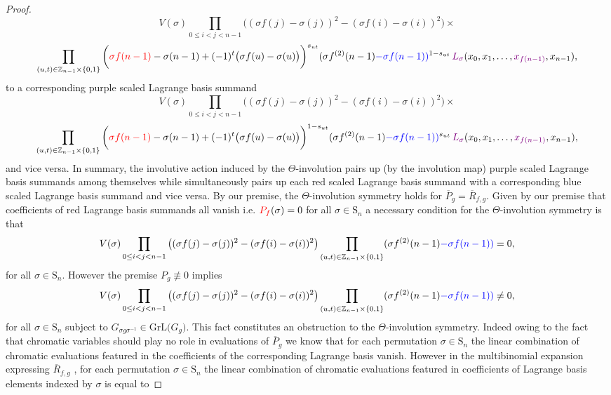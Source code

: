 \begin{proof}
 \[
 V(\sigma)\prod_{0\le i<j<n-1}\big((\sigma f(j)-\sigma(j))^{2}-(\sigma f(i)-\sigma(i))^{2}\big)\times
 \]
 \[
 \prod_{(u,t)\in\mathbb{Z}_{n-1}\times\{0,1\}}\bigg({\color{red}\sigma f(n-1)}-\sigma(n-1)+(-1)^{t}\big(\sigma f(u)-\sigma(u)\big)\bigg)^{s_{ut}}(\sigma f^{(2)}(n-1){\color{blue}-\sigma f(n-1)}{\color{blue})}^{1-s_{ut}}\,{\color{violet}L_{\sigma}}(x_{0},x_{1},\ldots,{\color{violet}x_{f(n-1)}},x_{n-1}),
 \]
 to a corresponding purple scaled Lagrange basis summand
 \[
 V(\sigma)\prod_{0\le i<j<n-1}\big((\sigma f(j)-\sigma(j))^{2}-(\sigma f(i)-\sigma(i))^{2}\big)\times
 \]
 \[
 \prod_{(u,t)\in\mathbb{Z}_{n-1}\times\{0,1\}}\bigg({\color{red}\sigma f(n-1)}-\sigma(n-1)+(-1)^{t}\big(\sigma f(u)-\sigma(u)\big)\bigg)^{1-s_{ut}}(\sigma f^{(2)}(n-1){\color{blue}-\sigma f(n-1)}{\color{blue})}^{s_{ut}}\,{\color{violet}L_{\sigma}}(x_{0},x_{1},\ldots,{\color{violet}x_{f(n-1)}},x_{n-1}),
 \]
 and vice versa. In summary, the involutive action induced by the $\Theta$-involution pairs up (by the involution map) purple scaled Lagrange basis summands among themselves while simultaneously pairs up each red scaled Lagrange basis summand with a corresponding blue scaled Lagrange basis summand and vice versa. By our premise, the $\Theta$-involution symmetry holds for $\overline{P}_{g}=\overline{R}_{f,g}$. Given by our premise that coefficients of red Lagrange basis summands all vanish i.e. ${\color{red}P_{f}}(\sigma)=0$ for all $\sigma\in\text{S}_{n}$ a necessary condition for the $\Theta$-involution symmetry is that
 \[
 V(\sigma)\prod_{0\le i<j<n-1}\big((\sigma f(j)-\sigma(j))^{2}-(\sigma f(i)-\sigma(i))^{2}\big)\prod_{(u,t)\in\mathbb{Z}_{n-1}\times\{0,1\}}(\sigma f^{(2)}(n-1){\color{blue}-\sigma f(n-1)}{\color{blue})}=0,
 \]
 for all $\sigma\in\text{S}_{n}$. However the premise $P_{g}\not\equiv0$ implies
 \[
 V(\sigma)\prod_{0\le i<j<n-1}\big((\sigma f(j)-\sigma(j))^{2}-(\sigma f(i)-\sigma(i))^{2}\big)\prod_{(u,t)\in\mathbb{Z}_{n-1}\times\{0,1\}}(\sigma f^{(2)}(n-1){\color{blue}-\sigma f(n-1)}{\color{blue})}\ne0,
 \]
 for all $\sigma\in\text{S}_{n}$ subject to $G_{\sigma g\sigma^{-1}}\in\text{GrL}\big(G_{g}\big)$. This fact constitutes an obstruction to the $\Theta$-involution symmetry. Indeed owing to the fact that chromatic variables should play no role in evaluations of $\overline{P}_{g}$ we know that for each permutation $\sigma\in\text{S}_{n}$ the linear combination of chromatic evaluations featured in the coefficients of the corresponding Lagrange basis vanish. However in the multibinomial expansion expressing $\overline{R}_{f,g}$ , for each permutation $\sigma\in\text{S}_{n}$ the linear combination of chromatic evaluations featured in coefficients of Lagrange basis elements indexed by $\sigma$ is equal to

\end{proof}
